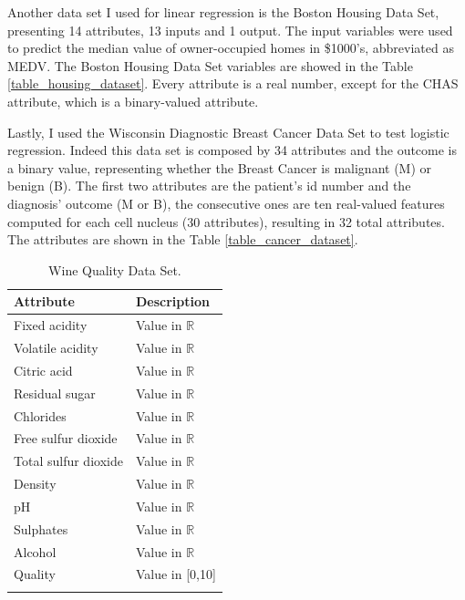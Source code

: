 \documentclass[10pt,journal,A4paper,compsoc,epsfig]{IEEEtran}
\begin{document}
Another data set I used for linear regression is the Boston Housing Data Set, presenting 14 attributes, 13 inputs and 1 output. The input variables were used to predict the median value of owner-occupied homes in \$1000's, abbreviated as MEDV. The Boston Housing Data Set variables are showed in the Table \ref{table_housing_dataset}. Every attribute is a real number, except for the CHAS attribute, which is a binary-valued attribute.

Lastly, I used the Wisconsin Diagnostic Breast Cancer Data Set to test logistic regression. Indeed this data set is composed by 34 attributes and the outcome is a binary value, representing whether the Breast Cancer is malignant (M) or benign (B). The first two attributes are the patient's id number and the diagnosis' outcome (M or B), the consecutive ones are ten real-valued features computed for each cell nucleus (30 attributes), resulting in 32 total attributes.
The attributes are shown in the Table \ref{table_cancer_dataset}.



\begin{table}
\centering
\begin{tabular}{l l}
Attribute & Description \\
\hline
\noalign{\medskip}
Fixed acidity & Value in $\mathbb{R}$ \\
\noalign{\smallskip}
Volatile acidity & Value in $\mathbb{R}$ \\
\noalign{\smallskip}
Citric acid & Value in $\mathbb{R}$ \\
\noalign{\smallskip}
Residual sugar & Value in $\mathbb{R}$ \\
\noalign{\smallskip}
Chlorides & Value in $\mathbb{R}$ \\
\noalign{\smallskip}
Free sulfur dioxide & Value in $\mathbb{R}$ \\
\noalign{\smallskip}
Total sulfur dioxide & Value in $\mathbb{R}$ \\
\noalign{\smallskip}
Density & Value in $\mathbb{R}$ \\
\noalign{\smallskip}
pH & Value in $\mathbb{R}$ \\
\noalign{\smallskip}
Sulphates & Value in $\mathbb{R}$ \\
\noalign{\smallskip}
Alcohol & Value in $\mathbb{R}$ \\
\noalign{\smallskip}
Quality & Value in [0,10] \\
\noalign{\smallskip}
\hline
\end{tabular}
\caption{Wine Quality Data Set.}
\label{table_wine_dataset}
\end{table}%
\end{document}

